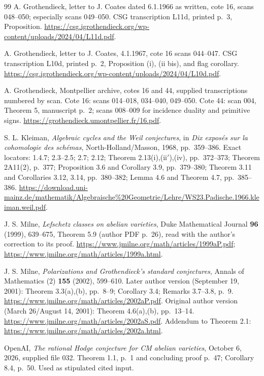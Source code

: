 \begin{thebibliography}{99}
A. Grothendieck, letter to J. Coates dated 6.1.1966 as written,
cote 16, scans 048--050; especially scans 049--050.
CSG transcription L11d, printed p.~3, Proposition.
\url{https://csg.igrothendieck.org/wp-content/uploads/2024/04/L11d.pdf}.

A. Grothendieck, letter to J. Coates, 4.1.1967,
cote 16 scans 044--047. CSG transcription L10d,
printed p.~2, Proposition (i), (ii bis), and flag corollary.
\url{https://csg.igrothendieck.org/wp-content/uploads/2024/04/L10d.pdf}.

A. Grothendieck, Montpellier archive, cotes 16 and 44,
supplied transcriptions numbered by scan.
Cote 16: scans 014--018, 034--040, 049--050.
Cote 44: scan 004, Theorem 5, manuscript p.~2;
scans 008--009 for incidence duality and primitive signs.
\url{https://grothendieck.umontpellier.fr/16.pdf}.

S. L. Kleiman, \emph{Algebraic cycles and the Weil conjectures},
in \emph{Dix expos\'es sur la cohomologie des sch\'emas},
North-Holland/Masson, 1968, pp.~359--386.
Exact locators: 1.4.7; 2.3--2.5; 2.7; 2.12;
Theorem 2.13(i),(ii$'$),(iv), pp.~372--373;
Theorem 2A11(2), p.~377;
Proposition 3.6 and Corollary 3.9, pp.~379--380;
Theorem 3.11 and Corollaries 3.12, 3.14, pp.~380--382;
Lemma 4.6 and Theorem 4.7, pp.~385--386.
\url{https://download.uni-mainz.de/mathematik/Algebraische%20Geometrie/Lehre/WS23.Padische.1966.kleiman.weil.pdf}.

J. S. Milne, \emph{Lefschetz classes on abelian varieties},
Duke Mathematical Journal \textbf{96} (1999), 639--675,
Theorem 5.9 (author PDF p.~26), read with the author's correction
to its proof.
\url{https://www.jmilne.org/math/articles/1999aP.pdf};
\url{https://www.jmilne.org/math/articles/1999a.html}.

J. S. Milne, \emph{Polarizations and Grothendieck's standard
conjectures}, Annals of Mathematics (2) \textbf{155} (2002), 599--610.
Later author version (September 19, 2001):
Theorem 3.3(a),(b), pp.~8--9; Corollary 3.4;
Remarks 3.7--3.8, p.~9.
\url{https://www.jmilne.org/math/articles/2002aP.pdf}.
Original author version (March 26/August 14, 2001):
Theorem 4.6(a),(b), pp.~13--14.
\url{https://www.jmilne.org/math/articles/2002aS.pdf}.
Addendum to Theorem 2.1:
\url{https://www.jmilne.org/math/articles/2002a.html}.

OpenAI, \emph{The rational Hodge conjecture for CM abelian
varieties}, October 6, 2026, supplied file 032.
Theorem 1.1, p.~1 and concluding proof p.~47;
Corollary 8.4, p.~50. Used as stipulated cited input.


\end{thebibliography}
